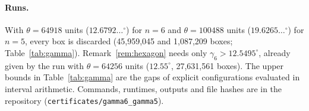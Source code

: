 \paragraph{Runs.} With $\theta=64918$ units ($12.6792\ldots^\circ$) for $n=6$ and $\theta=100488$ units
($19.6265\ldots^\circ$) for $n=5$, every box is discarded (45{,}959{,}045 and 1{,}087{,}209 boxes; Table~\ref{tab:gamma}).
Remark~\ref{rem:hexagon} needs only $\gamma_6>12.5495^\circ$, already given by the run with $\theta=64256$ units
($12.55^\circ$, 27{,}631{,}561 boxes). The upper bounds in Table~\ref{tab:gamma} are the gaps of explicit
configurations evaluated in interval arithmetic. Commands, runtimes, outputs and file hashes are in the
repository (\texttt{certificates/\allowbreak gamma6\_\allowbreak gamma5}).
